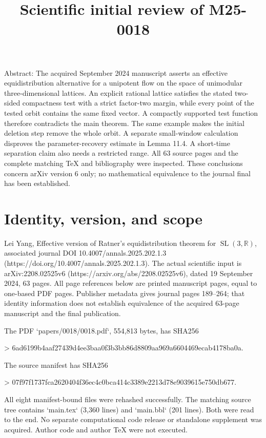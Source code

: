 \documentclass[10pt]{article}
\title{Scientific initial review of M25-0018}
\author{}
\date{}
\begin{document}
\maketitle
Abstract: The acquired September 2024 manuscript asserts an effective equidistribution alternative for a unipotent flow on the space of unimodular three-dimensional lattices. An explicit rational lattice satisfies the stated two-sided compactness test with a strict factor-two margin, while every point of the tested orbit contains the same fixed vector. A compactly supported test function therefore contradicts the main theorem. The same example makes the initial deletion step remove the whole orbit. A separate small-window calculation disproves the parameter-recovery estimate in Lemma 11.4. A short-time separation claim also needs a restricted range. All 63 source pages and the complete matching TeX and bibliography were inspected. These conclusions concern arXiv version 6 only; no mathematical equivalence to the journal final has been established.\par
\section*{Identity, version, and scope}
Lei Yang, Effective version of Ratner’s equidistribution theorem for \(\operatorname{SL}(3,\mathbb R)\), associated journal DOI 10.4007/annals.2025.202.1.3 (https://doi.org/10.4007/annals.2025.202.1.3). The actual scientific input is arXiv:2208.02525v6 (https://arxiv.org/abs/2208.02525v6), dated 19 September 2024, 63 pages. All page references below are printed manuscript pages, equal to one-based PDF pages. Publisher metadata gives journal pages 189–264; that identity information does not establish equivalence of the acquired 63-page manuscript and the final publication.\par
The PDF `papers/0018/0018.pdf`, 554,813 bytes, has SHA256\par
> 6ad6199b4aaf27439d4ee3baa0f3b3bb86d8809aa969a6604469ecab4178ba0a.\par
The source manifest has SHA256\par
> 07f97f1737fca2620404f36ec4c0bca414c3389e2213d78e9039615e750db677.\par
All eight manifest-bound files were rehashed successfully. The matching source tree contains `main.tex` (3,360 lines) and `main.bbl` (201 lines). Both were read to the end. No separate computational code release or standalone supplement was acquired. Author code and author TeX were not executed.\par
\end{document}
